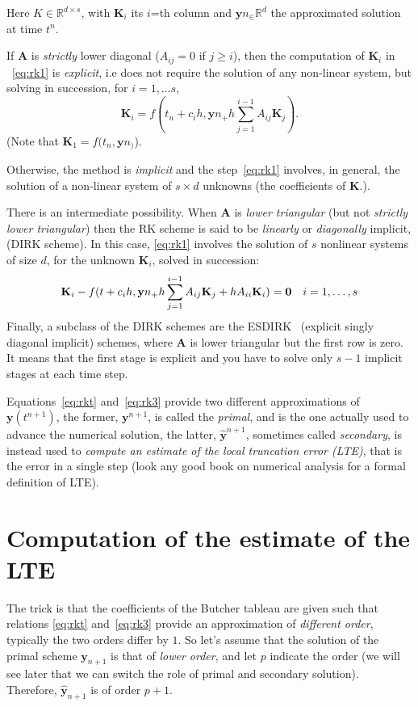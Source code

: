 \documentclass[10pt,a4paper,twoside]{article}
\begin{document}
Here $K\in\mathbb{R}^{d\times s}$, with $\mathbf{K}_i$ its $i$=th column and $\mathbf{y}n_\in\mathbb{R}^d$ the approximated solution at time $t^n$.

If $\mathbf{A}$ is \emph{strictly} lower diagonal ($A_{ij}=0$ if $j\ge i$), then the  computation of $\mathbf{K}_i$ in ~\eqref{eq:rk1} is \emph{explicit}, i.e does not require the solution of any non-linear system, but solving in succession, for $i=1,\ldots s$,
\[
\mathbf{K}_i = f(t_n+c_ih,\mathbf{y}n_+h\sum_{j=1}^{i-1} A_{ij}\mathbf{K}_j).
\]
(Note that $\mathbf{K}_1=f(t_n,\mathbf{y}n_)$). 

Otherwise, the method is \emph{implicit} and the step~\eqref{eq:rk1} involves, in general, the solution of a non-linear system of $s\times d$ unknowns (the coefficients of $\mathbf{K}$.).

There is an intermediate possibility. When $\mathbf{A}$ is \emph{lower triangular} (but not \emph{strictly lower triangular}) then the RK scheme is said to be \emph{linearly} or \emph{diagonally} implicit,
(DIRK scheme). In this case, \eqref{eq:rk1} involves the solution of $s$ nonlinear systems of size $d$, for the unknown $\mathbf{K}_i$, solved in succession:
\[
\mathbf{K}_i - f(t+c_ih,\mathbf{y}n_+h\sum_{j=1}^{i-1} A_{ij}\mathbf{K}_j +hA_{ii}\mathbf{K}_i)=\mathbf{0}\quad i=1,\ldots,s\\\label{eq:rk2ex}
\]
Finally, a subclass of the DIRK schemes are the ESDIRK~\cite{jorgensenFamilyESDIRKIntegration2018} (explicit singly diagonal implicit) 
schemes, where $\mathbf{A}$ is lower triangular but the first row is zero. It means that the first stage is explicit and you have to solve only $s-1$ implicit stages at each time step. 
\smallskip

Equations~\eqref{eq:rkt} and~\eqref{eq:rk3} provide two different approximations 
of $\mathbf{y}(t^{n+1})$, the former, $\mathbf{y}^{n+1}$, is called the \emph{primal}, and is the one actually 
used to advance the numerical solution, the latter, $\hat{\mathbf{y}}^{n+1}$, sometimes called \emph{secondary},
 is instead used  to \emph{compute an estimate of the local truncation error (LTE)}, that is the error in a single step (look any good book on numerical analysis
for a formal definition of LTE).

\section{Computation of the estimate of the LTE}
The trick is that the coefficients of the Butcher tableau are given such 
that relations \eqref{eq:rkt} and~\eqref{eq:rk3} provide an approximation of \emph{different order}, 
typically the two orders differ by $1$. So let's assume that the solution of the primal scheme $\mathbf{y}_{n+1}$ 
is that of \emph{lower order}, and let $p$ indicate the order (we will see later that we can switch the role of primal and secondary solution). 
Therefore, $\hat{\mathbf{y}}_{n+1}$ is of order $p+1$. 
\end{document}
